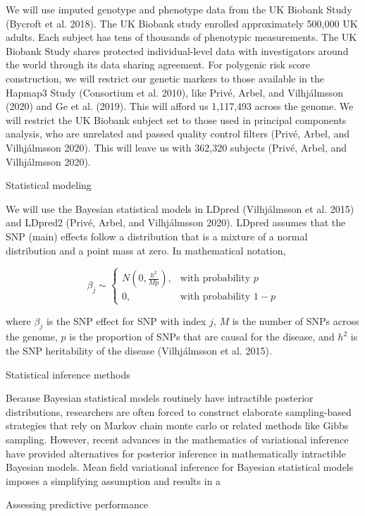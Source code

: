 \documentclass[
  11pt,
  letterpaper,
  DIV=11,
  numbers=noendperiod]{scrartcl}
\begin{document}
We will use imputed genotype and phenotype data from the UK Biobank
Study (Bycroft et al. 2018). The UK Biobank study enrolled approximately
500,000 UK adults. Each subject has tens of thousands of phenotypic
measurements. The UK Biobank Study shares protected individual-level
data with investigators around the world through its data sharing
agreement. For polygenic risk score construction, we will restrict our
genetic markers to those available in the Hapmap3 Study (Consortium et
al. 2010), like Privé, Arbel, and Vilhjálmsson (2020) and Ge et al.
(2019). This will afford us 1,117,493 across the genome. We will
restrict the UK Biobank subject set to those used in principal
components analysis, who are unrelated and passed quality control
filters (Privé, Arbel, and Vilhjálmsson 2020). This will leave us with
362,320 subjects (Privé, Arbel, and Vilhjálmsson 2020).

Statistical modeling

We will use the Bayesian statistical models in LDpred (Vilhjálmsson et
al. 2015) and LDpred2 (Privé, Arbel, and Vilhjálmsson 2020). LDpred
assumes that the SNP (main) effects follow a distribution that is a
mixture of a normal distribution and a point mass at zero. In
mathematical notation,

\[
\beta_j \sim    
    \begin{cases}  
        N(0, \frac{h^2}{Mp}), & \text{with probability } p \\
        0, & \text{with probability } 1-p
    \end{cases}  
\]

where \(\beta_j\) is the SNP effect for SNP with index \(j\), \(M\) is
the number of SNPs across the genome, \(p\) is the proportion of SNPs
that are causal for the disease, and \(h^2\) is the SNP heritability of
the disease (Vilhjálmsson et al. 2015).

Statistical inference methods

Because Bayesian statistical models routinely have intractible posterior
distributions, researchers are often forced to construct elaborate
sampling-based strategies that rely on Markov chain monte carlo or
related methods like Gibbs sampling. However, recent advances in the
mathematics of variational inference have provided alternatives for
posterior inference in mathematically intractible Bayesian models. Mean
field variational inference for Bayesian statistical models imposes a
simplifying assumption and results in a

Assessing predictive performance
\end{document}
